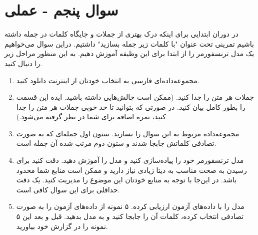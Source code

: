 \section{سوال پنجم - عملی}

در دوران ابتدایی برای اینکه درک بهتری از جملات و جایگاه کلمات در جمله داشته باشیم تمرینی تحت عنوان "با کلمات زیر جمله بسازید" داشتیم. دراین سوال می‌خواهیم یک مدل ترنسفورمر را از ابتدا برای این وظیفه آموزش دهیم. به این منظور مراحل زیر را دنبال کنید.

\begin{enumerate}
	\item مجموعه‌داده‌ای فارسی به انتخاب خودتان از اینترنت دانلود کنید.
	\begin{qsolve}
		
	\end{qsolve}
	
	
	
	
	
	\item جملات هر متن را جدا کنید. (ممکن است چالش‌هایی داشته باشید. ایده این قسمت را بطور کامل بیان کنید. در صورتی که بتوانید تا حد خوبی جملات هر متن را جدا کنید، نمره اضافه برای شما در نظر گرفته می‌شود.)
	\begin{qsolve}
		
	\end{qsolve}
	
	
	
	\item مجموعه‌داده مربوط به این سوال را بسازید. ستون اول جمله‌ای که به صورت تصادفی کلماتش جابجا شدند و ستون دوم مرتب شده آن جمله است.
	\begin{qsolve}
		
	\end{qsolve}
	
	
	
	
	\item مدل ترنسفورمر خود را پیاده‌سازی کنید و مدل را آموزش دهید. دقت کنید برای رسیدن به صحت مناسب به دیتا زیادی نیاز دارید و ممکن است منابع شما محدود باشد. در این‌جا با توجه به منابع خودتان این موضوع را مدیریت کنید. یک دقت حداقلی برای این سوال کافی است.
	\begin{qsolve}
		
	\end{qsolve}
	
	
	
	
	
	\item مدل را با داده‌های آزمون ارزیابی کرده. ۵ نمونه از داده‌های آزمون را به صورت تصادفی انتخاب کرده، کلمات آن را جابجا کنید و به مدل بدهید. قبل و بعد این ۵ نمونه را در گزارش خود بیاورید.
	\begin{qsolve}
		

\end{qsolve}
\end{enumerate}

